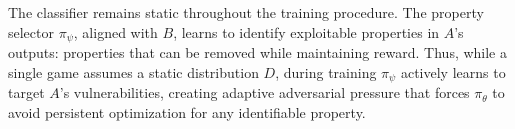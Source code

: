 The classifier remains static throughout the training procedure. The property selector $\pi_\psi$, aligned with $B$, learns to identify exploitable properties in $A$'s outputs: properties that can be removed while maintaining reward. Thus, while a single game assumes a static distribution $D$, during training $\pi_\psi$ actively learns to target $A$'s vulnerabilities, creating adaptive adversarial pressure that forces $\pi_\theta$ to avoid persistent optimization for any identifiable property.

% 
% 

